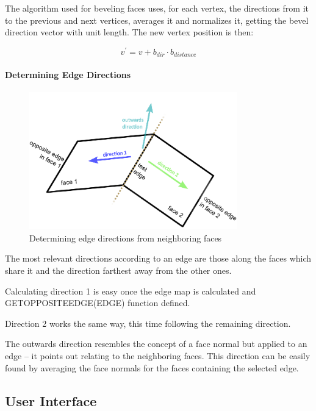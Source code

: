 The algorithm used for beveling faces uses, for each vertex,
the directions from it to the previous and next vertices,
averages it and normalizes it, getting the bevel direction vector with unit length.
The new vertex position is then:

\begin{equation}
	v^{'} = v + b_{dir} \cdot b_{distance}
\end{equation}


\paragraph{Determining Edge Directions}

\begin{figure}[!ht]
    \centering
    \includegraphics[width=9cm]{gfx/face-dirs.png}
    \vspace{-0.5cm}
    \caption{Determining edge directions from neighboring faces}
    \label{FIG-GS-FACE-DIRS}
\end{figure}

The most relevant directions according to an edge are those along the faces
which share it and the direction farthest away from the other ones.
 
Calculating direction 1 is easy once the edge map is calculated
and GETOPPOSITEEDGE(EDGE) function defined.

Direction 2 works the same way, this time following the remaining direction.

The outwards direction resembles the concept of a face normal but applied to an edge
-- it points out relating to the neighboring faces.
This direction can be easily found by averaging the face normals
for the faces containing the selected edge.


\subsection{User Interface}

